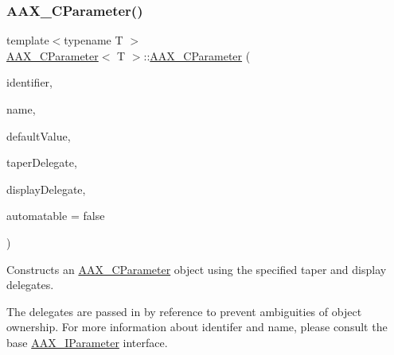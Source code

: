 \subsubsection{\texorpdfstring{AAX\_CParameter()}{AAX\_CParameter()}\hspace{0.1cm}{\footnotesize\ttfamily [1/4]}}
{\footnotesize\ttfamily template$<$typename T $>$ \\
\mbox{\hyperlink{a01537}{A\+A\+X\+\_\+\+C\+Parameter}}$<$ T $>$\+::\mbox{\hyperlink{a01537}{A\+A\+X\+\_\+\+C\+Parameter}} (\begin{DoxyParamCaption}\item[{\mbox{\hyperlink{a00392_a1440c756fe5cb158b78193b2fc1780d1}{A\+A\+X\+\_\+\+C\+Param\+ID}}}]{identifier,  }\item[{const \mbox{\hyperlink{a01873}{A\+A\+X\+\_\+\+I\+String}} \&}]{name,  }\item[{T}]{default\+Value,  }\item[{const \mbox{\hyperlink{a01881}{A\+A\+X\+\_\+\+I\+Taper\+Delegate}}$<$ T $>$ \&}]{taper\+Delegate,  }\item[{const \mbox{\hyperlink{a01801}{A\+A\+X\+\_\+\+I\+Display\+Delegate}}$<$ T $>$ \&}]{display\+Delegate,  }\item[{bool}]{automatable = {\ttfamily false} }\end{DoxyParamCaption})}



Constructs an \mbox{\hyperlink{a01537}{A\+A\+X\+\_\+\+C\+Parameter}} object using the specified taper and display delegates. 

The delegates are passed in by reference to prevent ambiguities of object ownership. For more information about {\ttfamily identifer} and {\ttfamily name}, please consult the base \mbox{\hyperlink{a01857}{A\+A\+X\+\_\+\+I\+Parameter}} interface.


